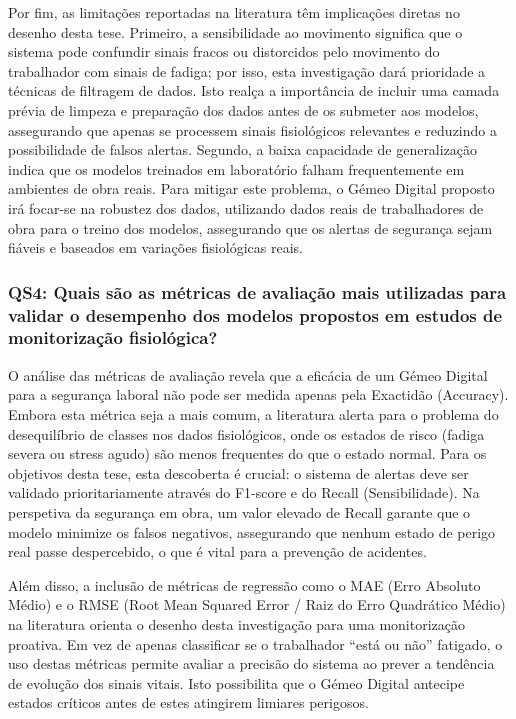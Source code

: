 Por fim, as limitações reportadas na literatura têm implicações diretas no desenho desta tese. Primeiro, a sensibilidade ao movimento significa que o sistema pode confundir sinais fracos ou distorcidos pelo movimento do trabalhador com sinais de fadiga; por isso, esta investigação dará prioridade a técnicas de filtragem de dados. Isto realça a importância de incluir uma camada prévia de limpeza e preparação dos dados antes de os submeter aos modelos, assegurando que apenas se processem sinais fisiológicos relevantes e reduzindo a possibilidade de falsos alertas. Segundo, a baixa capacidade de generalização indica que os modelos treinados em laboratório falham frequentemente em ambientes de obra reais. Para mitigar este problema, o Gémeo Digital proposto irá focar-se na robustez dos dados, utilizando dados reais de trabalhadores de obra para o treino dos modelos, assegurando que os alertas de segurança sejam fiáveis e baseados em variações fisiológicas reais.

\subsubsection*{QS4: Quais são as métricas de avaliação mais utilizadas para validar o desempenho dos modelos propostos em estudos de monitorização fisiológica?}
\label{subsubsec:qs4_analisis}

O análise das métricas de avaliação revela que a eficácia de um Gémeo Digital para a segurança laboral não pode ser medida apenas pela Exactidão (Accuracy). Embora esta métrica seja a mais comum, a literatura alerta para o problema do desequilíbrio de classes nos dados fisiológicos, onde os estados de risco (fadiga severa ou stress agudo) são menos frequentes do que o estado normal. Para os objetivos desta tese, esta descoberta é crucial: o sistema de alertas deve ser validado prioritariamente através do F1-score e do Recall (Sensibilidade). Na perspetiva da segurança em obra, um valor elevado de Recall garante que o modelo minimize os falsos negativos, assegurando que nenhum estado de perigo real passe despercebido, o que é vital para a prevenção de acidentes.

Além disso, a inclusão de métricas de regressão como o MAE (Erro Absoluto Médio) e o RMSE (Root Mean Squared Error / Raiz do Erro Quadrático Médio) na literatura orienta o desenho desta investigação para uma monitorização proativa. Em vez de apenas classificar se o trabalhador “está ou não” fatigado, o uso destas métricas permite avaliar a precisão do sistema ao prever a tendência de evolução dos sinais vitais. Isto possibilita que o Gémeo Digital antecipe estados críticos antes de estes atingirem limiares perigosos.

